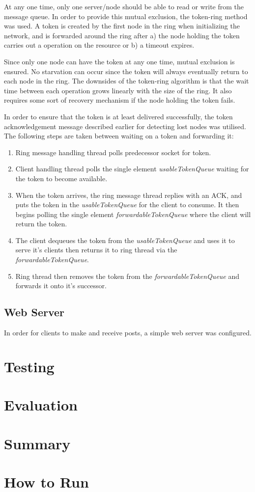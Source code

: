 \documentclass[12pt]{article}
\begin{document}
At any one time, only one server/node should be able to read or write from the message queue. In order to provide this mutual exclusion, the token-ring method was used. A token is created by the first node in the ring when initializing the network, and is forwarded around the ring after a) the node holding the token carries out a operation on the resource or b) a timeout expires. 

Since only one node can have the token at any one time, mutual exclusion is ensured. No starvation can occur since the token will always eventually return to each node in the ring. The downsides of the token-ring algorithm is that the wait time between each operation grows linearly with the size of the ring. It also requires some sort of recovery mechanism if the node holding the token fails.

In order to ensure that the token is at least delivered successfully, the token acknowledgement message described earlier for detecting lost nodes was utilised. The following steps are taken between waiting on a token and forwarding it:

\begin{enumerate}
	\item Ring message handling thread polls predecessor socket for token.
	\item Client handling thread polls the single element \emph{usableTokenQueue} waiting for the token to become available.
	\item When the token arrives, the ring message thread replies with an ACK, and puts the token in the \emph{usableTokenQueue} for the client to consume. It then begins polling the single element \emph{forwardableTokenQueue} where the client will return the token.
	\item The client dequeues the token from the \emph{usableTokenQueue} and uses it to serve it's clients then returns it to ring thread via the \emph{forwardableTokenQueue}.
	\item Ring thread then removes the token from the \emph{forwardableTokenQueue} and forwards it onto it's successor.
\end{enumerate}

\subsection{Web Server}

In order for clients to make and receive posts, a simple web server was configured. 

\section{Testing}

\section{Evaluation}

\section{Summary}

\section{How to Run}



\end{document}
